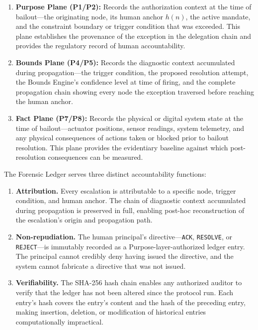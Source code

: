 \begin{enumerate}\itemsep=0pt
\item \textbf{Purpose Plane (P1/P2):} Records the authorization context at the time of bailout---the originating node, its human anchor $h(n)$, the active mandate, and the constraint boundary or trigger condition that was exceeded. This plane establishes the provenance of the exception in the delegation chain and provides the regulatory record of human accountability.

\item \textbf{Bounds Plane (P4/P5):} Records the diagnostic context accumulated during propagation---the trigger condition, the proposed resolution attempt, the Bounds Engine's confidence level at time of firing, and the complete propagation chain showing every node the exception traversed before reaching the human anchor.

\item \textbf{Fact Plane (P7/P8):} Records the physical or digital system state at the time of bailout---actuator positions, sensor readings, system telemetry, and any physical consequences of actions taken or blocked prior to bailout resolution. This plane provides the evidentiary baseline against which post-resolution consequences can be measured.
\end{enumerate}

The Forensic Ledger serves three distinct accountability functions:

\begin{enumerate}\itemsep=0pt
\item \textbf{Attribution.} Every escalation is attributable to a specific node, trigger condition, and human anchor. The chain of diagnostic context accumulated during propagation is preserved in full, enabling post-hoc reconstruction of the escalation's origin and propagation path.

\item \textbf{Non-repudiation.} The human principal's directive---\texttt{ACK}, \texttt{RESOLVE}, or \texttt{REJECT}---is immutably recorded as a Purpose-layer-authorized ledger entry. The principal cannot credibly deny having issued the directive, and the system cannot fabricate a directive that was not issued.

\item \textbf{Verifiability.} The SHA-256 hash chain enables any authorized auditor to verify that the ledger has not been altered since the protocol run. Each entry's hash covers the entry's content and the hash of the preceding entry, making insertion, deletion, or modification of historical entries computationally impractical.
\end{enumerate}

